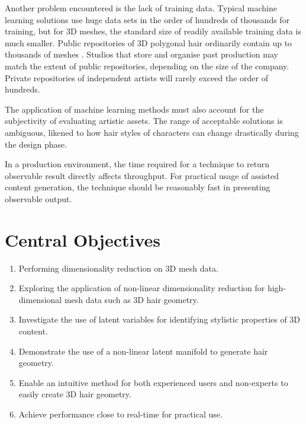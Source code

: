 \documentclass[ %
author={Dillon Keith Diep},
supervisor={Dr. Carl Henrik Ek},
degree={MEng},
title={ART-CG Hair:},
subtitle={Assisted Real-time Content Generation of Stylised Virtual Hair},
type={Research},
year={2017} ]{dissertation}
\begin{document}
Another problem encountered is the lack of training data. Typical machine learning solutions use huge data sets in the order of hundreds of thousands for training, but for 3D meshes, the standard size of readily available training data is much smaller. Public repositories of 3D polygonal hair ordinarily contain up to thousands of meshes \cite{tsr}. Studios that store and organise past production may match the extent of public repositories, depending on the size of the company. Private repositories of independent artists will rarely exceed the order of hundreds.

The application of machine learning methods must also account for the subjectivity of evaluating artistic assets. The range of acceptable solutions is ambiguous, likened to how hair styles of characters can change drastically during the design phase.

In a production environment, the time required for a technique to return observable result directly affects throughput. For practical usage of assisted content generation, the technique should be reasonably fast in presenting observable output.

\section{Central Objectives}
\label{chap:context:objectives}
\begin{enumerate}
	\item Performing dimensionality reduction on 3D mesh data.
	\item Exploring the application of non-linear dimensionality reduction for high-dimensional mesh data such as 3D hair geometry.
	\item Investigate the use of latent variables for identifying stylistic properties of 3D content.
	\item Demonstrate the use of a non-linear latent manifold to generate hair geometry.
	\item Enable an intuitive method for both experienced users and non-experts to easily create 3D hair geometry.
	\item Achieve performance close to real-time for practical use.
\end{enumerate}

\end{document}
